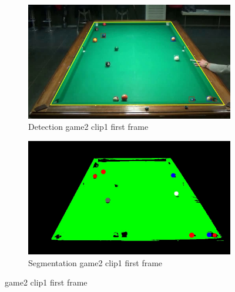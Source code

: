 \begin{figure}[H]
    \centering
    \begin{subfigure}[b]{0.35\textwidth}
        \centering
        \includegraphics[width=\textwidth]{images/Detection/game2_clip1_detected_balls_first_frame.jpg}
        \caption{Detection game2 clip1 first frame}
        \label{fig: game2_clip1_first_frame_detected}
    \end{subfigure}
    \begin{subfigure}[b]{0.35\textwidth}
        \centering
        \includegraphics[width=\textwidth]{images/Segmentation/game2_clip1_segmented_balls_first_frame.jpg}
        \caption{Segmentation game2 clip1 first frame}
		\label{fig: game2_clip1_first_frame_segmented}
    \end{subfigure}
	\caption{game2 clip1 first frame}
\end{figure}

